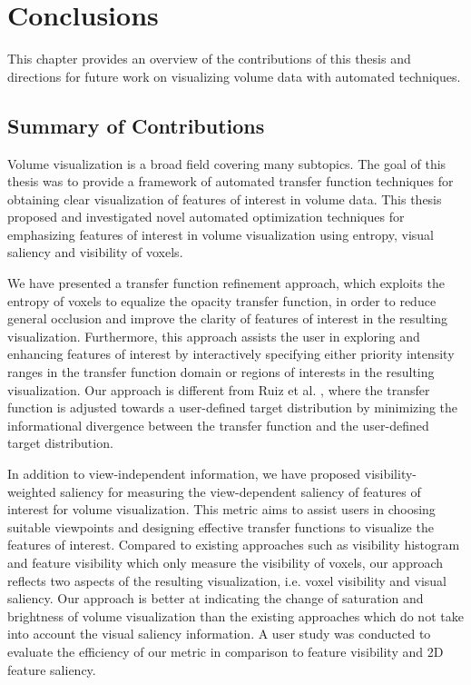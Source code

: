 \chapter{Conclusions \label{conclusions}}

This chapter provides an overview of the contributions of this thesis and directions for future work on visualizing volume data with automated techniques.

\section{Summary of Contributions}
Volume visualization is a broad field covering many subtopics. The goal of this thesis was to provide a framework of automated transfer function techniques for obtaining clear visualization of features of interest in volume data. This thesis proposed and investigated novel automated optimization techniques for emphasizing features of interest in volume visualization using entropy, visual saliency and visibility of voxels.

We have presented a transfer function refinement approach, which exploits the entropy of voxels to equalize the opacity transfer function, in order to reduce general occlusion and improve the clarity of features of interest in the resulting visualization.
Furthermore, this approach assists the user in exploring and enhancing features of interest by interactively specifying either priority intensity ranges in the transfer function domain or regions of interests in the resulting visualization.
Our approach is different from Ruiz et al. \cite{ruiz_automatic_2011}, where the transfer function is adjusted towards a user-defined target distribution by minimizing the informational divergence between the transfer function and the user-defined target distribution.

In addition to view-independent information, we have proposed visibility-weighted saliency for measuring the view-dependent saliency of features of interest for volume visualization.
This metric aims to assist users in choosing suitable viewpoints and designing effective transfer functions to visualize the features of interest.
Compared to existing approaches such as visibility histogram \cite{correa_visibility_2011} and feature visibility \cite{wang_efficient_2011} which only measure the visibility of voxels, our approach reflects two aspects of the resulting visualization, i.e. voxel visibility and visual saliency. Our approach is better at indicating the change of saturation and brightness of volume visualization than the existing approaches which do not take into account the visual saliency information. A user study was conducted to evaluate the efficiency of our metric in comparison to feature visibility and 2D feature saliency.

